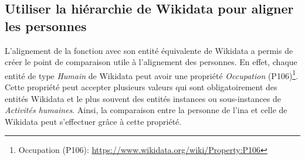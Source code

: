 \subsection{\label{II-C-3-b}Utiliser la hiérarchie de Wikidata pour aligner les personnes}

L'alignement de la fonction avec son entité équivalente de Wikidata a permis de créer le point de comparaison utile à l'alignement des personnes. En effet, chaque entité de type \textit{Humain} de Wikidata peut avoir une propriété \textit{Occupation} (P106)\footnote{Occupation (P106): \url{https://www.wikidata.org/wiki/Property:P106}}. Cette propriété peut accepter plusieurs valeurs qui sont obligatoirement des entités Wikidata et le plus souvent des entités instances ou sous-instances de \textit{Activités humaines}. Ainsi, la comparaison entre la personne de l'\ac{ina} et celle de Wikidata peut s'effectuer grâce à cette propriété.\\

